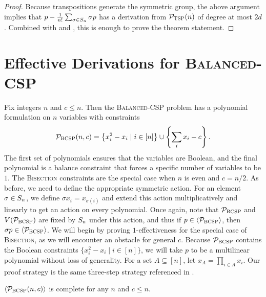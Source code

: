\begin{proof}
Because transpositions generate the symmetric group, the above argument implies that $p - \frac{1}{n!}\sum_{\sigma \in S_{n}} \sigma p$ has a derivation from $\mathcal P_{\textsc{TSP}}(n)$ of degree at most $2d$. Combined with  and , this is enough to prove the theorem statement. 
\end{proof}

\section{Effective Derivations for \textsc{Balanced-CSP}}\label{sec:bcsp}
Fix integers $n$ and $c \leq n$. Then the \textsc{Balanced-CSP} problem has a polynomial formulation on $n$ variables with constraints
\begin{align}
\mathcal P_{\textsc{BCSP}}(n,c) = \left\{x_i^2 - x_i\mid i \in [n]\right\} \cup \left\{\sum_i x_i - c\right\}.\label{eq:bcsp-formulation}
\end{align}
The first set of polynomials ensures that the variables are Boolean, and the final polynomial is a balance constraint that forces a specific number of variables to be $1$. The \textsc{Bisection} constraints are the special case when $n$ is even and $c = n/2$. 
As before, we need to define the appropriate symmetric action. For an element $\sigma \in S_{n}$, we define $\sigma x_i = x_{\sigma(i)}$ and extend this action multiplicatively and linearly to get an action on every polynomial. 
Once again, note that $\mathcal P_{\textsc{BCSP}}$ and $V(\mathcal P_{\textsc{BCSP}})$ are fixed by $S_{n}$ under this action, and thus if $p \in \langle \mathcal P_{\textsc{BCSP}} \rangle$, then $\sigma p \in \langle \mathcal P_{\textsc{BCSP}} \rangle$. 
We will begin by proving $1$-effectiveness for the special case of \textsc{Bisection}, as we will encounter an obstacle for general $c$. 
Because $\mathcal P_{\textsc{BCSP}}$ contains the Boolean constraints $\{x_i^2 - x_i \mid i \in [n]\}$, we will take $p$ to be a multilinear polynomial without loss of generality. 
For a set $A \subseteq [n]$, let $x_A = \prod_{i \in A} x_i$.
Our proof strategy is the same three-step strategy referenced in .
\begin{lemma}\label{lem:bcsp-complete}
$\langle \mathcal P_{\textsc{BCSP}}(n,c) \rangle$ is complete for any $n$ and $c \leq n$.
\end{lemma}
